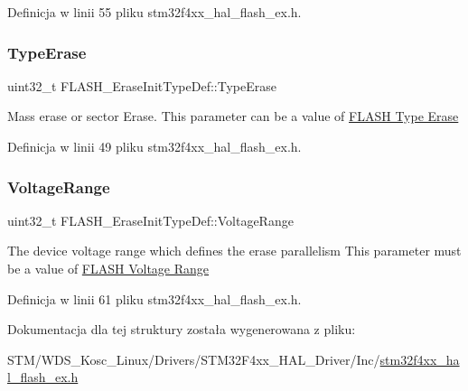 Definicja w linii 55 pliku stm32f4xx\+\_\+hal\+\_\+flash\+\_\+ex.\+h.

\mbox{\label{struct_f_l_a_s_h___erase_init_type_def_a5d08471046a663db76d2252848a7d66c}} 
\subsubsection{\texorpdfstring{Type\+Erase}{TypeErase}}
{\footnotesize\ttfamily uint32\+\_\+t F\+L\+A\+S\+H\+\_\+\+Erase\+Init\+Type\+Def\+::\+Type\+Erase}

Mass erase or sector Erase. This parameter can be a value of \hyperlink{group___f_l_a_s_h_ex___type___erase}{F\+L\+A\+SH Type Erase} 

Definicja w linii 49 pliku stm32f4xx\+\_\+hal\+\_\+flash\+\_\+ex.\+h.

\mbox{\label{struct_f_l_a_s_h___erase_init_type_def_a3a2a0c2c4ed573bb84c768c6dbb92cc9}} 
\subsubsection{\texorpdfstring{Voltage\+Range}{VoltageRange}}
{\footnotesize\ttfamily uint32\+\_\+t F\+L\+A\+S\+H\+\_\+\+Erase\+Init\+Type\+Def\+::\+Voltage\+Range}

The device voltage range which defines the erase parallelism This parameter must be a value of \hyperlink{group___f_l_a_s_h_ex___voltage___range}{F\+L\+A\+SH Voltage Range} 

Definicja w linii 61 pliku stm32f4xx\+\_\+hal\+\_\+flash\+\_\+ex.\+h.



Dokumentacja dla tej struktury została wygenerowana z pliku\+:\begin{DoxyCompactItemize}
\item 
S\+T\+M/\+W\+D\+S\+\_\+\+Kosc\+\_\+\+Linux/\+Drivers/\+S\+T\+M32\+F4xx\+\_\+\+H\+A\+L\+\_\+\+Driver/\+Inc/\hyperlink{stm32f4xx__hal__flash__ex_8h}{stm32f4xx\+\_\+hal\+\_\+flash\+\_\+ex.\+h}\end{DoxyCompactItemize}
